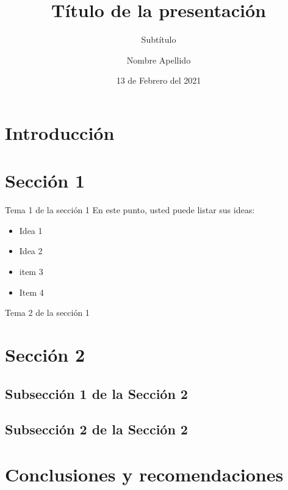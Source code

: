 \documentclass[aspectratio=169]{beamer}
\title[Título corto]{Título de la presentación}
\subtitle{Subtítulo}
\author{Nombre Apellido}
\institute[E.P.N]{Escuela Politécnica Nacional \par Facultad de Ingeniería en Sistemas \par Nombre de la materia}
\date{13 de Febrero del 2021}
\begin{document}
    {
        \frame{\titlepage}
    }




    \section{Introducción}


    \section{Sección 1}
    \begin{frame}{Tema 1 de la sección 1}
        En este punto, usted puede listar sus ideas:
        \begin{itemize}
            \item Idea 1
            \item Idea 2
            \item item 3
            \item Item 4
        \end{itemize}
    \end{frame}
    \begin{frame}{Tema 2 de la sección 1}
    \end{frame}


    \section{Sección 2}
    \subsection{Subsección 1 de la Sección 2}
    \subsection{Subsección 2 de la Sección 2}


    \section{Conclusiones y recomendaciones}
\end{document}
